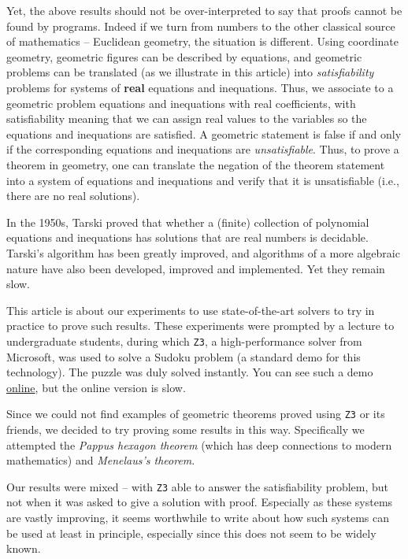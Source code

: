 \documentclass{amsart}
\theoremstyle{plain}
\theoremstyle{definition}
\theoremstyle{remark}
\begin{document}
Yet, the above results should not be over-interpreted to say that proofs
cannot be found by programs. Indeed if we turn from numbers to the other
classical source of mathematics -- Euclidean geometry, the situation is
different. Using coordinate geometry, geometric figures can be described by equations,
and geometric problems can be translated (as we illustrate in this article) into
\emph{satisfiability} problems for systems of \textbf{real} equations and inequations. Thus, we
associate to a geometric problem equations and inequations with real coefficients,
with satisfiability meaning that we can
assign real values to the variables so the equations and inequations are satisfied.
A geometric statement is false if and only if the corresponding equations and inequations are \emph{unsatisfiable}. Thus, to prove a theorem in geometry, one can translate the negation of the theorem statement into a system of equations and inequations and verify that it is unsatisfiable (i.e., there are no real solutions).

In the 1950s, Tarski proved that whether a (finite)
collection of polynomial equations and inequations has solutions that
are real numbers is decidable.  Tarski's algorithm has been greatly improved,
and algorithms of a more algebraic nature have also been developed,
improved and implemented. Yet they remain slow.

This article is about our experiments to use
state-of-the-art solvers to try in practice to prove such results.
These experiments were prompted by a lecture
to undergraduate students, during which \texttt{Z3}, a high-performance
solver from Microsoft, was used to solve a Sudoku problem (a standard demo for
this technology). The puzzle was duly solved instantly. You can see such
a demo \href{https://rise4fun.com/Z3/Cs7p}{online}, but the online
version is slow.

Since we could not find examples of geometric theorems proved using \texttt{Z3} or
its friends, we decided to try proving
some results in this way. Specifically we attempted the \emph{Pappus hexagon theorem}
(which has deep connections to modern mathematics) and \emph{Menelaus's theorem}.

Our results were mixed -- with \texttt{Z3} able to answer the satisfiability problem,
but not when it was asked to give a solution with proof.
Especially as these systems are vastly improving, it seems worthwhile to
write about how such systems can be used at least in principle,
especially since this does not seem to be widely known.
\end{document}
